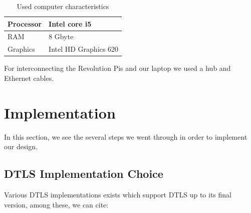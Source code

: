 \begin{table}[H]
\centering
    \begin{tabular}{|l|l|}
      \hline
      Processor & Intel core i5 \\
      \hline
      RAM & 8 Gbyte \\
      \hline
      Graphics & Intel HD Graphics 620 \\
      \hline
  \end{tabular}
  \caption{Used computer characteristics}
  \label{computer_characteristics}
\end{table}

For interconnecting the Revolution Pis and our laptop we used a hub and Ethernet cables.

\section{Implementation}

In this section, we see the several steps we went through in order to implement our design.

\subsection{DTLS Implementation Choice}

Various DTLS implementations exists which support DTLS up to its final version, among these, we can cite:

